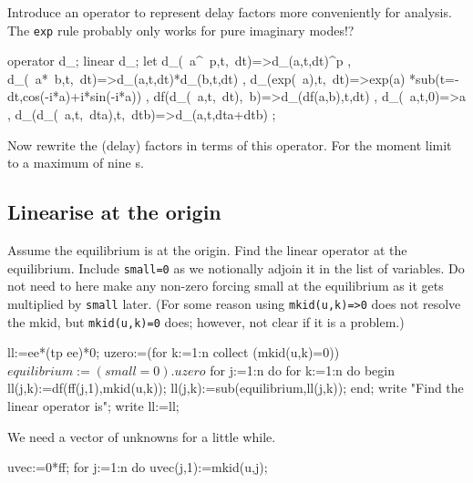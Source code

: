 \documentclass[11pt,a5paper]{article}
\begin{document}
Introduce an operator to represent delay factors more
conveniently for analysis.  The \verb|exp| rule probably
only works for pure imaginary modes!?
\begin{reduce}
operator d_; linear d_;
let { d_(~a^~p,t,~dt)=>d_(a,t,dt)^p
    , d_(~a*~b,t,~dt)=>d_(a,t,dt)*d_(b,t,dt)
    , d_(exp(~a),t,~dt)=>exp(a)
        *sub(t=-dt,cos(-i*a)+i*sin(-i*a))
    , df(d_(~a,t,~dt),~b)=>d_(df(a,b),t,dt)
    , d_(~a,t,0)=>a
    , d_(d_(~a,t,~dta),t,~dtb)=>d_(a,t,dta+dtb)
    };
\end{reduce}

Now rewrite the (delay) factors in terms of this operator.
For the moment limit to a maximum of nine \ode{}s.


\subsection{Linearise at the origin}

Assume the equilibrium is at the origin. Find the linear
operator at the equilibrium.  Include \verb|small=0| as we
notionally adjoin it in the list of variables.  Do not need
to here make any non-zero forcing small at the equilibrium
as it gets multiplied by \verb|small| later.  (For some
reason using \verb|mkid(u,k)=>0| does not resolve the mkid,
but \verb|mkid(u,k)=0| does; however, not clear if it is a
problem.)
\begin{reduce}
ll:=ee*(tp ee)*0; %
uzero:=(for k:=1:n collect (mkid(u,k)=0))$
equilibrium:=(small=0).uzero$
for j:=1:n do for k:=1:n do begin 
  ll(j,k):=df(ff(j,1),mkid(u,k));
  ll(j,k):=sub(equilibrium,ll(j,k));
end;
write "Find the linear operator is";
write ll:=ll;
\end{reduce}

We need a vector of unknowns for a little while.
\begin{reduce}
uvec:=0*ff; %
for j:=1:n do uvec(j,1):=mkid(u,j);
\end{reduce}
\end{document}
